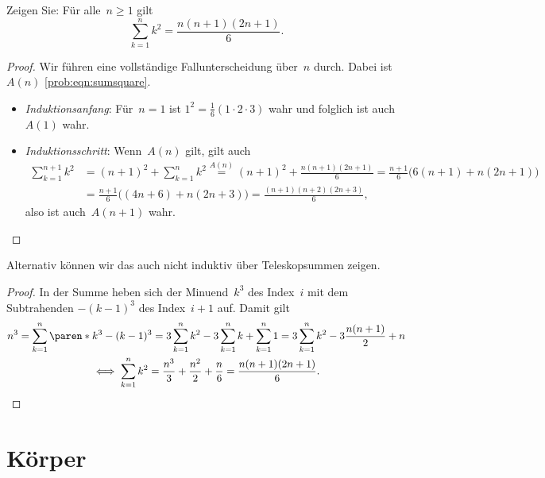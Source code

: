 \documentclass[a4paper]{article}
\begin{document}
\begin{problem}
    Zeigen Sie: Für alle~$n \geq 1$ gilt
    \begin{equation}
        \sum_{k=1}^n k^2 = \frac{n (n+1) (2n+1)}{6}.\label{prob:eqn:sumsquare}
    \end{equation}
\end{problem}

\begin{solution}
    \begin{proof}
        Wir führen eine vollständige Fallunterscheidung über~$n$ durch. Dabei ist~$A(n)$ \cref{prob:eqn:sumsquare}.

        \begin{itemize}
            \item \emph{Induktionsanfang}: Für~$n = 1$ ist $1^2 = \frac{1}{6} (1 \cdot 2 \cdot 3)$ wahr und folglich ist auch $A(1)$ wahr.
            \item \emph{Induktionsschritt}: Wenn~$A(n)$ gilt, gilt auch
            \begin{align*}
                \sum_{k=1}^{n+1} k^2 &= (n+1)^2 + \sum_{k=1}^n k^2 \overset{A(n)}{=} (n+1)^2 + \frac{n(n+1)(2n+1)}{6} = \frac{n+1}{6} \bigl(6(n+1) + n(2n+1)\bigr) \\
                &= \frac{n+1}{6} \bigl((4n+6) + n(2n+3)\bigr) = \frac{(n+1) (n+2) (2n+3)}{6},
            \end{align*}
            also ist auch~$A(n+1)$ wahr.\qedhere
        \end{itemize}
    \end{proof}

    Alternativ können wir das auch nicht induktiv über Teleskopsummen zeigen.

    \begin{proof}
        In der Summe heben sich der Minuend~$k^3$ des Index~$i$ mit dem Subtrahenden $-(k-1)^3$ des Index~$i+1$ auf. Damit gilt
        \begin{gather*}
            n^3 = \sum_{k=1}^n \paren*{k^3 - (k-1)^3} = 3\sum_{k=1}^n k^2 - 3\sum_{k=1}^n k + \sum_{k=1}^n 1 = 3\sum_{k=1}^n k^2 - 3\frac{n (n+1)}{2} + n \\
            \iff \sum_{k=1}^n k^2 = \frac{n^3}{3} + \frac{n^2}{2} + \frac{n}{6} = \frac{n (n+1) (2n+1)}{6}. \qedhere
    \end{gather*}
    \end{proof}
\end{solution}

\section{Körper}
\end{document}
